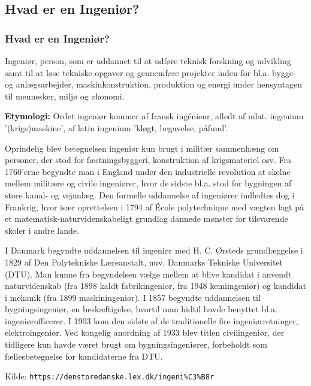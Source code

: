 \documentclass[t, aspectratio=169]{beamer}
\begin{document}
\subsection{Hvad er en Ingeniør?}
\begin{frame}[fragile]
  \frametitle{Hvad er en Ingeniør?}
  
  \newcommand{\scaletext}[1]{\scriptsize{#1}}
  
  \vspace{0mm}
  \scaletext{
    Ingeniør, person, som er uddannet til at udføre teknisk forskning og udvikling samt til at løse tekniske opgaver og gennemføre projekter inden for bl.a. bygge- og anlægsarbejder, maskinkonstruktion, produktion og energi under hensyntagen til mennesker, miljø og økonomi.
  }
  
  \vspace{3mm}
  \scaletext{
    \textbf{Etymologi:}
    Ordet ingeniør kommer af fransk ingénieur, afledt af mlat. ingenium '(krigs)maskine', af latin ingenium 'kløgt, begavelse, påfund'. 
  }
  
  \vspace{3mm}
  \scaletext{
    Oprindelig blev betegnelsen ingeniør kun brugt i militær sammenhæng om personer, der stod for fæstningsbyggeri, konstruktion af krigsmateriel osv. Fra 1760'erne begyndte man i England under den industrielle revolution at skelne mellem militære og civile ingeniører, hvor de sidste bl.a. stod for bygningen af store kanal- og vejanlæg. Den formelle uddannelse af ingeniører indledtes dog i Frankrig, hvor især oprettelsen i 1794 af École polytechnique med vægten lagt på et matematisk-naturvidenskabeligt grundlag dannede mønster for tilsvarende skoler i andre lande.
  }
  
  \vspace{3mm}
  \scaletext{
    I Danmark begyndte uddannelsen til ingeniør med H. C. Ørsteds grundlæggelse i 1829 af Den Polytekniske Læreanstalt, nuv. Danmarks Tekniske Universitet (DTU). Man kunne fra begyndelsen vælge mellem at blive kandidat i anvendt naturvidenskab (fra 1898 kaldt fabrikingeniør, fra 1948 kemiingeniør) og kandidat i mekanik (fra 1899 maskiningeniør). I 1857 begyndte uddannelsen til bygningsingeniør, en beskæftigelse, hvortil man hidtil havde benyttet bl.a. ingeniørofficerer. I 1903 kom den sidste af de traditionelle fire ingeniørretninger, elektroingeniør. Ved kongelig anordning af 1933 blev titlen civilingeniør, der tidligere kun havde været brugt om bygningsingeniører, forbeholdt som fællesbetegnelse for kandidaterne fra DTU.
  }
  
  \vspace{1mm}
  \scaletext{Kilde: \texttt{https://denstoredanske.lex.dk/ingeni\%C3\%B8r}}
\end{frame}
\end{document}
